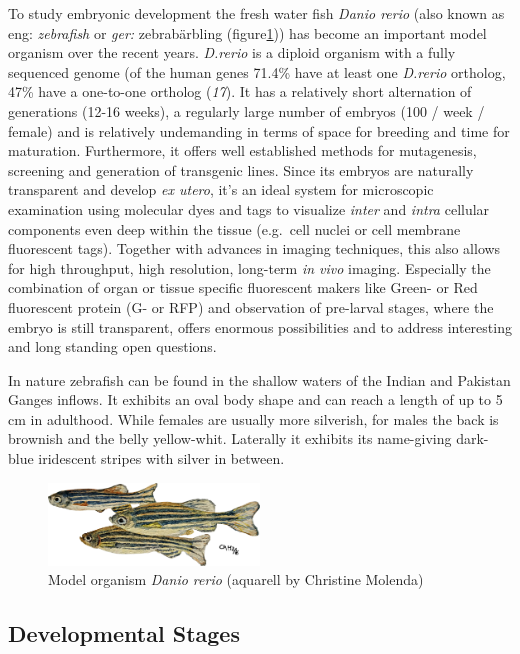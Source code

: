 \documentclass[11pt,singlespacinge,twoside]{reedthesis} %
\begin{document}
To study embryonic development the fresh water fish \emph{Danio rerio} (also known as eng: \emph{zebrafish} or \emph{ger:} zebrabärbling (figure\ref{fig:zebra})) has become an important model organism over the recent years. \emph{D.rerio} is a diploid organism with a fully sequenced genome (of the human genes 71.4\% have at least one \emph{D.rerio} ortholog, 47\% have a one-to-one ortholog (\emph{17}). It has a relatively short alternation of generations (12-16 weeks), a regularly large number of embryos (100 / week / female) and is relatively undemanding in terms of space for breeding and time for maturation. Furthermore, it offers well established methods for mutagenesis, screening and generation of transgenic lines. Since its embryos are naturally transparent and develop \emph{ex utero}, it's an ideal system for microscopic examination using molecular dyes and tags to visualize \emph{inter} and \emph{intra} cellular components even deep within the tissue (e.g.~cell nuclei or cell membrane fluorescent tags). Together with advances in imaging techniques, this also allows for high throughput, high resolution, long-term \emph{in vivo} imaging. Especially the combination of organ or tissue specific fluorescent makers like Green- or Red fluorescent protein (G- or RFP) and observation of pre-larval stages, where the embryo is still transparent, offers enormous possibilities and to address interesting and long standing open questions.

In nature zebrafish can be found in the shallow waters of the Indian and Pakistan Ganges inflows. It exhibits an oval body shape and can reach a length of up to 5 cm in adulthood. While females are usually more silverish, for males the back is brownish and the belly yellow-whit. Laterally it exhibits its name-giving dark-blue iridescent stripes with silver in between.


\begin{figure}

{\centering \includegraphics[width=0.50\textwidth]{figures/intro/CM_fish} 

}

\caption{Model organism \emph{Danio rerio} (aquarell by Christine Molenda)}\label{fig:zebra}
\end{figure}
\hypertarget{developmental-stages}{%
\subsection{Developmental Stages}\label{developmental-stages}}
\end{document}
